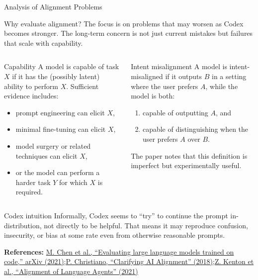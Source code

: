 \documentclass[aspectratio=43,9pt]{beamer}
\newcommand{\srclink}[2]{\href{#2}{\textcolor{black!68}{#1}}}
\newcommand{\sep}{;\hspace{0.35em}}
\newcommand{\refline}[2][References]{%
  \vfill
  {\raggedright\fontsize{5.1}{5.5}\selectfont\color{black!68}\textbf{#1:} #2\par}%
}
\newcommand{\srcChen}{\srclink{M. Chen et al., ``Evaluating large language models trained on code,'' arXiv (2021)}{https://arxiv.org/abs/2107.03374}}
\newcommand{\srcChristiano}{\srclink{P. Christiano, ``Clarifying AI Alignment'' (2018)}{https://ai-alignment.com/clarifying-ai-alignment-cec47cd69dd6}}
\newcommand{\srcKenton}{\srclink{Z. Kenton et al., ``Alignment of Language Agents'' (2021)}{https://arxiv.org/abs/2103.14659}}
\begin{document}
\begin{frame}{Analysis of Alignment Problems}
\tiny
\begin{block}{Why evaluate alignment?}
The focus is on problems that may worsen as Codex becomes stronger. The long-term concern is not just current mistakes but failures that scale with capability.
\end{block}

\begin{columns}[T,totalwidth=\textwidth]
\begin{block}{Capability}
A model is capable of task \(X\) if it has the (possibly latent) ability to perform \(X\). Sufficient evidence includes:
\begin{itemize}
  \item prompt engineering can elicit \(X\),
  \item minimal fine-tuning can elicit \(X\),
  \item model surgery or related techniques can elicit \(X\),
  \item or the model can perform a harder task \(Y\) for which \(X\) is required.
\end{itemize}
\end{block}

\begin{block}{Intent misalignment}
A model is intent-misaligned if it outputs \(B\) in a setting where the user prefers \(A\), while the model is both:
\begin{enumerate}
  \item capable of outputting \(A\), and
  \item capable of distinguishing when the user prefers \(A\) over \(B\).
\end{enumerate}
The paper notes that this definition is imperfect but experimentally useful.
\end{block}
\end{columns}

\begin{block}{Codex intuition}
Informally, Codex seems to ``try'' to continue the prompt in-distribution, not directly to be helpful. That means it may reproduce confusion, insecurity, or bias at some rate even from otherwise reasonable prompts.
\end{block}

\refline{\srcChen\sep \srcChristiano\sep \srcKenton}
\end{frame}
\end{document}
